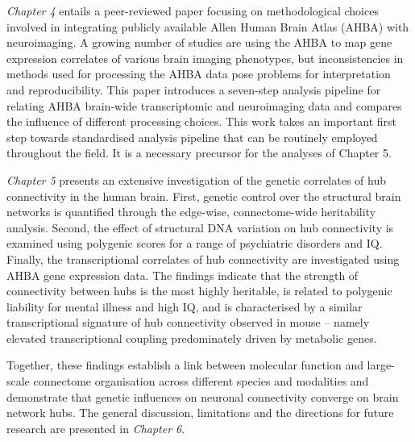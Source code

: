 \textit{Chapter 4} entails a peer-reviewed paper focusing on methodological choices involved in integrating publicly available Allen Human Brain Atlas (AHBA) with neuroimaging. A growing number of studies are using the AHBA to map gene expression correlates of various brain imaging phenotypes, but inconsistencies in methods used for processing the AHBA data pose problems for interpretation and reproducibility. This paper introduces a seven-step analysis pipeline for relating AHBA brain-wide transcriptomic and neuroimaging data and compares the influence of different processing choices. This work takes an important first step towards standardised analysis pipeline that can be routinely employed throughout the field. It is a necessary precursor for the analyses of Chapter 5.

\textit{Chapter 5} presents an extensive investigation of the genetic correlates of hub connectivity in the human brain. First, genetic control over the structural brain networks is quantified through the edge-wise, connectome-wide heritability analysis. Second, the effect of structural DNA variation on hub connectivity is examined using polygenic scores for a range of psychiatric disorders and IQ. Finally, the transcriptional correlates of hub connectivity are investigated using AHBA gene expression data. The findings indicate that the strength of connectivity between hubs is the most highly heritable, is related to polygenic liability for mental illness and high IQ, and is characterised by a similar transcriptional signature of hub connectivity observed in mouse -- namely elevated transcriptional coupling predominately driven by metabolic genes.

Together, these findings establish a link between molecular function and large-scale connectome organisation across different species and modalities and demonstrate that genetic influences on neuronal connectivity converge on brain network hubs. The general discussion, limitations and the directions for future research are presented in \textit{Chapter 6}.
